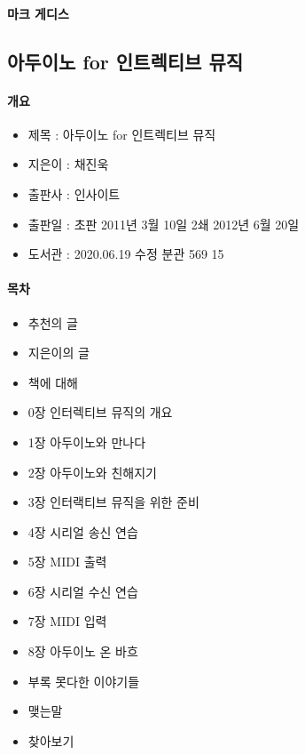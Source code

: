\documentclass[12pt, a4paper, oneside]{book}
\begin{document}
\paragraph{마크 게디스}



	\subsection{아두이노 for 인트렉티브 뮤직}


\paragraph{개요}

\begin{itemize}[					
		topsep=0.0em,			
		parsep=0.0em,			
		itemsep=0em,			
		leftmargin=	3	em,
		labelwidth=	1	em,			
		labelsep=		1	 em			
]					
	\item	제목 	: 아두이노 for 인트렉티브 뮤직
	\item	지은이 	: 채진욱
	\item	출판사 	: 인사이트
	\item	출판일 	: 초판 2011년 3월 10일 2쇄 2012년 6월 20일
	\item	도서관 	: 2020.06.19 수정 분관 569 15

\end{itemize}				



\paragraph{목차}
	
\begin{itemize}[					
		topsep=0.0em,			
		parsep=0.0em,			
		itemsep=0em,			
		leftmargin=	3	em,
		labelwidth=	1	em,			
		labelsep=		1	 em			
]					

	\item		추천의 글
	\item		지은이의 글
	\item		책에 대해
	\item		0장 인터렉티브 뮤직의 개요
	\item		1장 아두이노와 만나다
	\item		2장 아두이노와 친해지기
	\item		3장 인터랙티브 뮤직을 위한 준비
	\item		4장 시리얼 송신 연습
	\item		5장 MIDI 출력
	\item		6장 시리얼 수신 연습
	\item		7장 MIDI 입력
	\item		8장 아두이노 온 바흐
	\item		부록 못다한 이야기들
	\item		맺는말
	\item		찾아보기
\end{itemize}					
\end{document}
